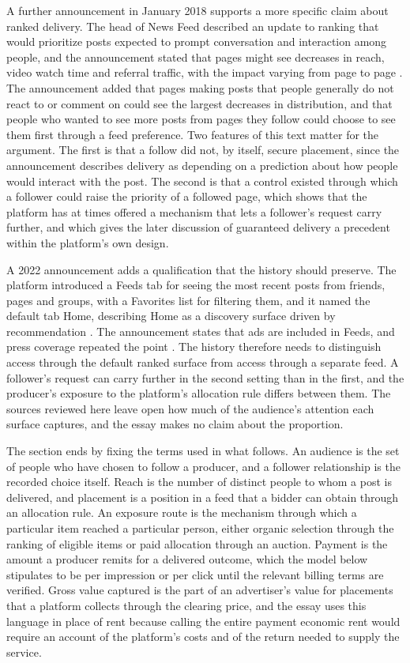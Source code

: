 \documentclass[11pt]{article}
\theoremstyle{definition}
\begin{document}
A further announcement in January 2018 supports a more specific claim about ranked delivery. The head of News Feed described an update to ranking that would prioritize posts expected to prompt conversation and interaction among people, and the announcement stated that pages might see decreases in reach, video watch time and referral traffic, with the impact varying from page to page \cite{mosseri2018}. The announcement added that pages making posts that people generally do not react to or comment on could see the largest decreases in distribution, and that people who wanted to see more posts from pages they follow could choose to see them first through a feed preference. Two features of this text matter for the argument. The first is that a follow did not, by itself, secure placement, since the announcement describes delivery as depending on a prediction about how people would interact with the post. The second is that a control existed through which a follower could raise the priority of a followed page, which shows that the platform has at times offered a mechanism that lets a follower's request carry further, and which gives the later discussion of guaranteed delivery a precedent within the platform's own design.

A 2022 announcement adds a qualification that the history should preserve. The platform introduced a Feeds tab for seeing the most recent posts from friends, pages and groups, with a Favorites list for filtering them, and it named the default tab Home, describing Home as a discovery surface driven by recommendation \cite{meta2022}. The announcement states that ads are included in Feeds, and press coverage repeated the point \cite{meta2022,foxbusiness2022}. The history therefore needs to distinguish access through the default ranked surface from access through a separate feed. A follower's request can carry further in the second setting than in the first, and the producer's exposure to the platform's allocation rule differs between them. The sources reviewed here leave open how much of the audience's attention each surface captures, and the essay makes no claim about the proportion.

The section ends by fixing the terms used in what follows. An audience is the set of people who have chosen to follow a producer, and a follower relationship is the recorded choice itself. Reach is the number of distinct people to whom a post is delivered, and placement is a position in a feed that a bidder can obtain through an allocation rule. An exposure route is the mechanism through which a particular item reached a particular person, either organic selection through the ranking of eligible items or paid allocation through an auction. Payment is the amount a producer remits for a delivered outcome, which the model below stipulates to be per impression or per click until the relevant billing terms are verified. Gross value captured is the part of an advertiser's value for placements that a platform collects through the clearing price, and the essay uses this language in place of rent because calling the entire payment economic rent would require an account of the platform's costs and of the return needed to supply the service.
\end{document}
